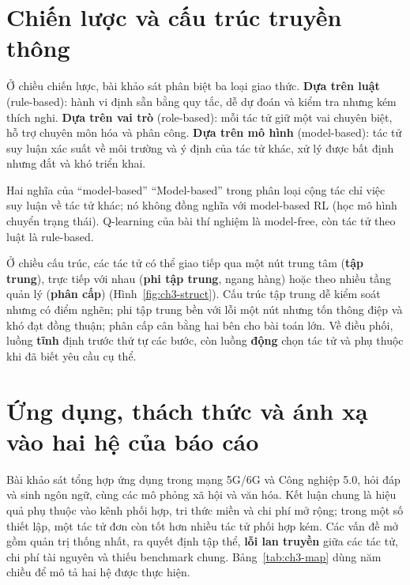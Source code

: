 

\section{Chiến lược và cấu trúc truyền thông}

Ở chiều chiến lược, bài khảo sát phân biệt ba loại giao thức. \textbf{Dựa trên luật} (rule-based): hành vi định
sẵn bằng quy tắc, dễ dự đoán và kiểm tra nhưng kém thích nghi. \textbf{Dựa trên vai trò} (role-based): mỗi tác tử
giữ một vai chuyên biệt, hỗ trợ chuyên môn hóa và phân công. \textbf{Dựa trên mô hình} (model-based): tác tử suy luận
xác suất về môi trường và ý định của tác tử khác, xử lý được bất định nhưng đắt và khó triển khai.

\begin{luuy}{Hai nghĩa của ``model-based''}
``Model-based'' trong phân loại cộng tác chỉ việc suy luận về tác tử khác; nó không đồng nghĩa với model-based RL
(học mô hình chuyển trạng thái). Q-learning của bài thí nghiệm là model-free, còn tác tử theo luật là rule-based.
\end{luuy}

Ở chiều cấu trúc, các tác tử có thể giao tiếp qua một nút trung tâm (\textbf{tập trung}), trực tiếp với nhau
(\textbf{phi tập trung}, ngang hàng) hoặc theo nhiều tầng quản lý (\textbf{phân cấp}) (Hình~\ref{fig:ch3-struct}).
Cấu trúc tập trung dễ kiểm soát nhưng có điểm nghẽn; phi tập trung bền với lỗi một nút nhưng tốn thông điệp và khó
đạt đồng thuận; phân cấp cân bằng hai bên cho bài toán lớn. Về điều phối, luồng \textbf{tĩnh} định trước thứ tự các
bước, còn luồng \textbf{động} chọn tác tử và phụ thuộc khi đã biết yêu cầu cụ thể.


\section{Ứng dụng, thách thức và ánh xạ vào hai hệ của báo cáo}

Bài khảo sát tổng hợp ứng dụng trong mạng 5G/6G và Công nghiệp 5.0, hỏi đáp và sinh ngôn ngữ, cùng các mô phỏng
xã hội và văn hóa. Kết luận chung là hiệu quả phụ thuộc vào kênh phối hợp, tri thức miền và chi phí mở rộng; trong
một số thiết lập, một tác tử đơn còn tốt hơn nhiều tác tử phối hợp kém. Các vấn đề mở gồm quản trị thống nhất,
ra quyết định tập thể, \textbf{lỗi lan truyền} giữa các tác tử, chi phí tài nguyên và thiếu benchmark chung.
Bảng~\ref{tab:ch3-map} dùng năm chiều để mô tả hai hệ được thực hiện.

